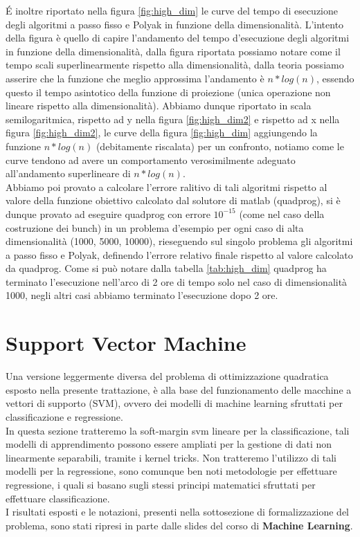\documentclass[12pt]{extarticle}
\begin{document}
\'E inoltre riportato nella figura \ref{fig:high_dim} le curve del tempo di esecuzione degli algoritmi a passo fisso e Polyak in funzione della dimensionalità. L'intento della figura è quello di capire l'andamento del tempo d'esecuzione degli algoritmi in funzione della dimensionalità, dalla figura riportata possiamo notare come il tempo scali superlinearmente rispetto alla dimensionalità, dalla teoria possiamo asserire che la funzione che meglio approssima l'andamento è $n*log(n)$, essendo questo il tempo asintotico della funzione di proiezione (unica operazione non lineare rispetto alla dimensionalità). Abbiamo dunque riportato in scala semilogaritmica, rispetto ad y nella figura \ref{fig:high_dim2} e rispetto ad x nella figura \ref{fig:high_dim2}, le curve della figura \ref{fig:high_dim} aggiungendo la funzione $n*log(n)$ (debitamente riscalata) per un confronto, notiamo come le curve tendono ad avere un comportamento verosimilmente adeguato all'andamento superlineare di $n*log(n)$.\\
Abbiamo poi provato a calcolare l'errore ralitivo di tali algoritmi rispetto al valore della funzione obiettivo calcolato dal solutore di matlab (quadprog), si è dunque provato ad eseguire quadprog con errore $10^{-15}$ (come nel caso della costruzione dei bunch) in un problema d'esempio per ogni caso di alta dimensionalità (1000, 5000, 10000), rieseguendo sul singolo problema gli algoritmi a passo fisso e Polyak, definendo l'errore relativo finale rispetto al valore calcolato da quadprog. Come si può notare dalla tabella \ref{tab:high_dim} quadprog ha terminato l'esecuzione nell'arco di 2 ore di tempo solo nel caso di dimensionalità 1000, negli altri casi abbiamo terminato l'esecuzione dopo 2 ore.

\section{Support Vector Machine}
Una versione leggermente diversa del problema di ottimizzazione quadratica esposto nella presente trattazione, è alla base del funzionamento delle macchine a vettori di supporto (SVM), ovvero dei modelli di machine learning sfruttati per classificazione e regressione.\\
In questa sezione tratteremo la soft-margin svm lineare per la classificazione, tali modelli di apprendimento possono essere ampliati per la gestione di dati non linearmente separabili, tramite i kernel tricks.
Non tratteremo l'utilizzo di tali modelli per la regressione, sono comunque ben noti metodologie per effettuare regressione, i quali si basano sugli stessi principi matematici sfruttati per effettuare classificazione.\\
I risultati esposti e le notazioni, presenti nella sottosezione di formalizzazione del problema, sono stati ripresi in parte dalle slides del corso di \textbf{Machine Learning}.
\end{document}
